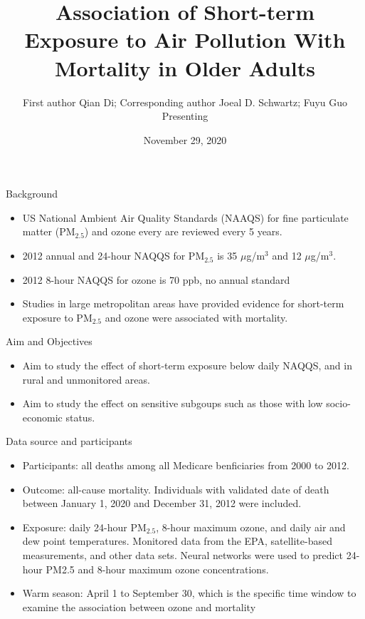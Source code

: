 \documentclass[ignorenonframetext,]{beamer}
\title{Association of Short-term Exposure to Air Pollution With Mortality in
Older Adults}
\author{First author Qian Di; Corresponding author Joeal D. Schwartz; Fuyu Guo
Presenting}
\date{November 29, 2020}
\providecommand{\tightlist}{%
  \setlength{\itemsep}{0pt}\setlength{\parskip}{0pt}}
\begin{document}
\frame{\titlepage}

\begin{frame}{Background}

\begin{itemize}
\tightlist
\item
  US National Ambient Air Quality Standards (NAAQS) for fine particulate
  matter (PM\(_{2.5}\)) and ozone every are reviewed every 5 years.
\item
  2012 annual and 24-hour NAQQS for PM\(_{2.5}\) is 35
  \(\mu\)g/m\(^{3}\) and 12 \(\mu\)g/m\(^{3}\).
\item
  2012 8-hour NAQQS for ozone is 70 ppb, no annual standard
\item
  Studies in large metropolitan areas have provided evidence for
  short-term exposure to PM\(_{2.5}\) and ozone were associated with
  mortality.
\end{itemize}

\end{frame}

\begin{frame}{Aim and Objectives}

\begin{itemize}
\tightlist
\item
  Aim to study the effect of short-term exposure below daily NAQQS, and
  in rural and unmonitored areas.
\item
  Aim to study the effect on sensitive subgoups such as those with low
  socio-economic status.
\end{itemize}

\end{frame}

\begin{frame}{Data source and participants}

\begin{itemize}
\tightlist
\item
  Participants: all deaths among all Medicare benficiaries from 2000 to
  2012.
\item
  Outcome: all-cause mortality. Individuals with validated date of death
  between January 1, 2020 and December 31, 2012 were included.
\item
  Exposure: daily 24-hour PM\(_{2.5}\), 8-hour maximum ozone, and daily
  air and dew point temperatures. Monitored data from the EPA,
  satellite-based measurements, and other data sets. Neural networks
  were used to predict 24-hour PM2.5 and 8-hour maximum ozone
  concentrations.
\item
  Warm season: April 1 to September 30, which is the specific time
  window to examine the association between ozone and mortality
\end{itemize}

\end{frame}
\end{document}

